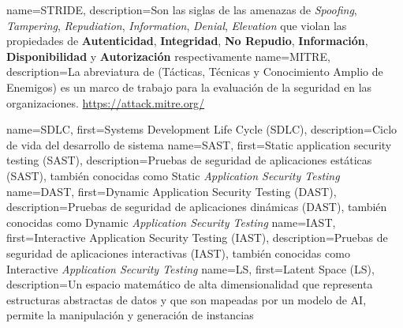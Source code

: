    {name={STRIDE},     description={Son las siglas de las amenazas de \textit{Spoofing}, \textit{Tampering}, \textit{Repudiation}, \textit{Information}, \textit{Denial}, \textit{Elevation} que violan las propiedades de \textbf{Autenticidad}, \textbf{Integridad}, \textbf{No Repudio}, \textbf{Información}, \textbf{Disponibilidad} y \textbf{Autorización} respectivamente}}
    {name={MITRE}, description={La abreviatura de (Tácticas, Técnicas y Conocimiento Amplio de Enemigos) es un marco de trabajo para la evaluación de la seguridad en las organizaciones. \url{https://attack.mitre.org/}}}


 {name={SDLC},   first={Systems Development Life Cycle (SDLC)},              description={Ciclo de vida del desarrollo de sistema}}
 {name={SAST},   first={Static application security testing (SAST)},         description={Pruebas de seguridad de aplicaciones estáticas (SAST), también conocidas como Static \textit{Application Security Testing}}}
 {name={DAST},   first={Dynamic Application Security Testing (DAST)},        description={Pruebas de seguridad de aplicaciones dinámicas (DAST), también conocidas como Dynamic \textit{Application Security Testing}}}
 {name={IAST},   first={Interactive Application Security Testing (IAST)},    description={Pruebas de seguridad de aplicaciones interactivas (IAST), también conocidas como Interactive \textit{Application Security Testing}}}
   {name={LS},     first={Latent Space (LS)},                                  description={Un espacio matemático de alta dimensionalidad que representa estructuras abstractas de datos y que son mapeadas por un modelo de AI, permite la manipulación y generación de instancias}}



